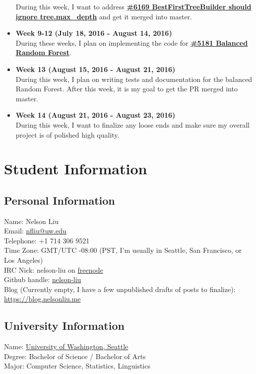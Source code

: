 \documentclass[12pt, oneside]{article}
\begin{document}
\begin{itemize}
  During this week, I want to address
  \textbf{\href{https://github.com/scikit-learn/scikit-learn/pull/6169}
    {\#6169 BestFirstTreeBuilder should ignore tree.max\_depth}} and
  get it merged into master.
  \item 
  \textbf{Week 9-12 (July 18, 2016 - August 14, 2016)}\\
  During these weeks, I plan on implementing the code for
  \textbf{\href{https://github.com/scikit-learn/scikit-learn/pull/5181}
    {\#5181 Balanced Random Forest}}.
  \item
  \textbf{Week 13 (August 15, 2016 - August 21, 2016)}\\
  During this week, I plan on writing tests and documentation for the
  balanced Random Forest. After this week, it is my goal to get the PR
  merged into master.
  \item
  \textbf{Week 14 (August 21, 2016 - August 23, 2016)}\\
  During this week, I want to finalize any loose ends and make sure my
  overall project is of polished high quality.
\end{itemize}
\section{Student Information}
\subsection{Personal Information}
Name: Nelson Liu\\
Email: \href{mailto:nfliu@uw.edu}{nfliu@uw.edu}\\
Telephone: +1 714 306 9521\\
Time Zone: GMT/UTC -08:00 (PST, I'm usually in Seattle, San Francisco,
or Los Angeles)\\
IRC Nick: nelson-liu on \href{https://webchat.freenode.net/}{freenode}\\
Github handle: \href{https://github.com/nelson-liu}{nelson-liu}\\
Blog (Currently empty, I have a few unpublished drafts of posts to finalize):
\href{http://blog.nelsonliu.me}{https://blog.nelsonliu.me}\\
\subsection{University Information}
Name: \href{http://www.washington.edu/}{University of Washington, Seattle}\\
Degree: Bachelor of Science / Bachelor of Arts\\
Major: Computer Science, Statistics, Linguistics
\end{document}
